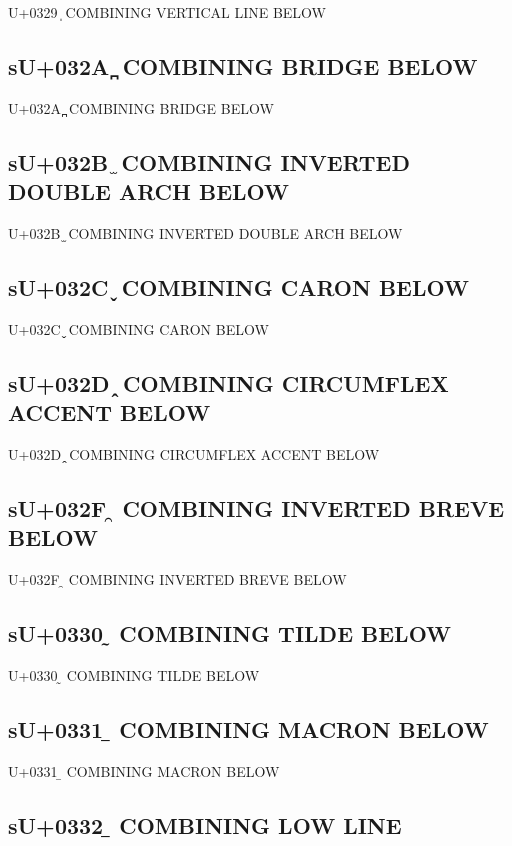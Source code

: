 U+0329 ̩ COMBINING VERTICAL LINE BELOW

\subsection{sU+032A ̪ COMBINING BRIDGE BELOW}

U+032A ̪ COMBINING BRIDGE BELOW

\subsection{sU+032B ̫ COMBINING INVERTED DOUBLE ARCH BELOW}

U+032B ̫ COMBINING INVERTED DOUBLE ARCH BELOW

\subsection{sU+032C ̬ COMBINING CARON BELOW}

U+032C ̬ COMBINING CARON BELOW

\subsection{sU+032D ̭ COMBINING CIRCUMFLEX ACCENT BELOW}

U+032D ̭ COMBINING CIRCUMFLEX ACCENT BELOW

\subsection{sU+032F ̯ COMBINING INVERTED BREVE BELOW}

U+032F ̯ COMBINING INVERTED BREVE BELOW

\subsection{sU+0330 ̰ COMBINING TILDE BELOW}

U+0330 ̰ COMBINING TILDE BELOW

\subsection{sU+0331 ̱ COMBINING MACRON BELOW}

U+0331 ̱ COMBINING MACRON BELOW

\subsection{sU+0332 ̲ COMBINING LOW LINE}

